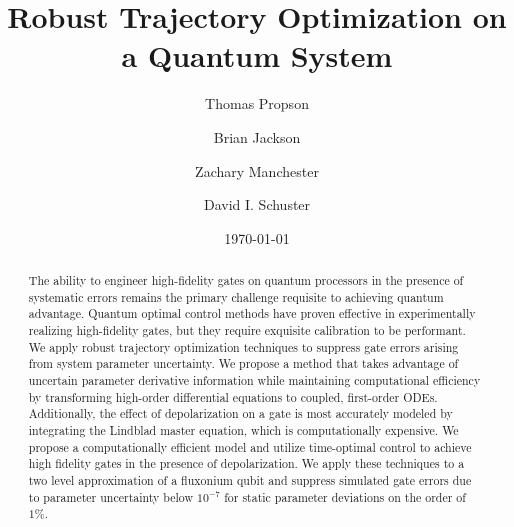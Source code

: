 \title{Robust Trajectory Optimization on a Quantum System}

\author{Thomas Propson}
\author{Brian Jackson}
\author{Zachary Manchester}
\author{David I. Schuster}

\date{\today}

\begin{abstract}
  The ability to engineer high-fidelity gates on quantum processors in the presence of
  systematic errors remains the primary challenge requisite to achieving quantum advantage.
  Quantum optimal control methods have proven effective in experimentally
  realizing high-fidelity gates, but they require exquisite calibration to be performant.
  We apply robust trajectory optimization techniques to suppress gate errors arising from system
  parameter uncertainty.
  We propose a method that takes advantage of uncertain parameter
  derivative information while maintaining
  computational efficiency by transforming high-order differential equations to coupled,
  first-order ODEs.
  Additionally, the effect of depolarization on a gate is most accurately modeled by
  integrating the Lindblad master equation,
  which is computationally expensive.
  We propose a computationally efficient model
  and utilize time-optimal control to achieve high fidelity gates in the presence of depolarization.
  We apply these techniques to a two level approximation of a fluxonium qubit and suppress
  simulated gate errors due to parameter uncertainty below $10^{-7}$ for
  static parameter deviations on the order of $1\%$.
\end{abstract}

\maketitle
